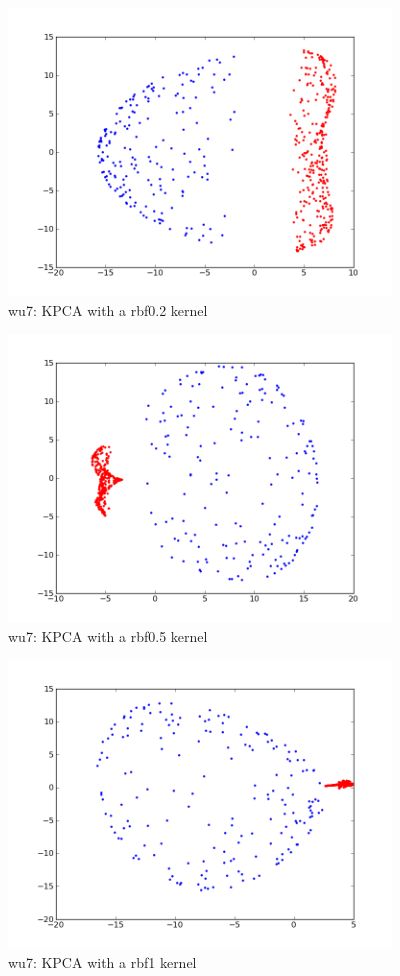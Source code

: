 \begin{figure}[here]
	\center
	\caption{wu7: KPCA with a rbf0.2 kernel}
	\label{fig:wu7_rbf0_2}
	\includegraphics[width=4.0in]{img/wu7_rbf0_2.png}
\end{figure}

\begin{figure}[here]
	\center
	\caption{wu7: KPCA with a rbf0.5 kernel}
	\label{fig:wu7_rbf0_5}
	\includegraphics[width=4.0in]{img/wu7_rbf0_5.png}
\end{figure}

\begin{figure}[here]
	\center
	\caption{wu7: KPCA with a rbf1 kernel}
	\label{fig:wu7_rbf1}
	\includegraphics[width=4.0in]{img/wu7_rbf1.png}
\end{figure}

